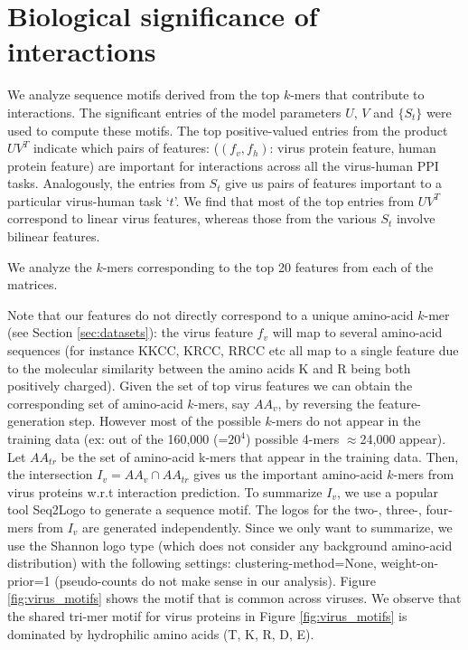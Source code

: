 \documentclass[a4paper,11pt]{article}
\begin{document}
\section{Biological significance of interactions} 

We analyze sequence motifs derived from the top $k$-mers that contribute to interactions. The significant entries of the model parameters $U$, $V$ and $\{S_t\}$ were used to
compute these motifs. The top positive-valued entries from the product $U V^T$ indicate which pairs of features: ($(f_v, f_h)$: virus protein feature, human protein feature) are important for interactions across all the virus-human PPI tasks.
Analogously, the entries from $S_t$ give us pairs of features important to a particular virus-human task `$t$'.
We find that most of the top entries from $U V^T$ correspond to linear virus features, whereas those from the various $S_t$
involve bilinear features. 

We analyze the $k$-mers corresponding to the top 20 features from each of the matrices.

Note that our features do not directly correspond to a unique amino-acid $k$-mer (see Section \ref{sec:datasets}):
the virus feature $f_v$ will map to several amino-acid sequences (for instance KKCC, KRCC, RRCC etc all map to a single feature due to the molecular similarity between the amino acids K and R being both positively charged). Given the set of top virus features we can obtain the corresponding set of
amino-acid $k$-mers, say $AA_v$, by reversing the feature-generation step. However most of the possible $k$-mers do not appear in the
training data (ex: out of the 160,000 (=$20^4$) possible 4-mers $\approx$24,000 appear). Let $AA_{tr}$
be the set of amino-acid k-mers that appear in the training data. Then, the intersection $I_v = AA_v \cap AA_{tr}$ gives us the important amino-acid $k$-mers from virus proteins w.r.t interaction prediction.
To summarize $I_v$, we use a popular tool Seq2Logo \citep{seq2logo} to generate a sequence motif.
The logos for the two-, three-, four-mers from $I_v$ are generated independently. Since we only
want to summarize, we use the Shannon logo type (which does not consider any background amino-acid distribution)
with the following settings: clustering-method=None, weight-on-prior=1 (pseudo-counts do not make sense in our
analysis). Figure \ref{fig:virus_motifs} shows the motif that is common across viruses. %
We observe that the shared tri-mer motif for virus proteins in Figure \ref{fig:virus_motifs} is dominated by
hydrophilic amino acids (T, K, R, D, E).
\end{document}
